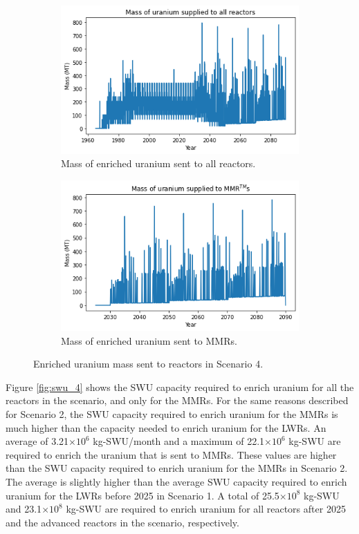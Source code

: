 \begin{figure}
    \centering
    \begin{subfigure}{0.5\textwidth}
        \centering
        \includegraphics[scale=0.5]{../figures/fuelsupply_scenarios_4.png}
        \caption{Mass of enriched uranium sent to all reactors.}
        \label{fig:totalfuel_4}
    \end{subfigure}
    \hspace{0.8cm}
    \begin{subfigure}{0.5\textwidth}
        \centering
        \includegraphics[scale=0.5]{../figures/advancedRX_fuelsupply_scenarios_4.png}
        \caption{Mass of enriched uranium sent to \glspl{MMR}.}
        \label{fig:haleu_4}
    \end{subfigure}
    \caption{Enriched uranium mass sent to reactors in Scenario 4.}
    \label{fig:fuel_4}
\end{figure}

Figure \ref{fig:swu_4} shows the \gls{SWU} capacity required to 
enrich uranium for all the reactors in the scenario, and 
only for the \glspl{MMR}. For the same reasons described for 
Scenario 2, the \gls{SWU} capacity required to enrich uranium 
for the \glspl{MMR} is much higher than the capacity needed to 
enrich uranium for the \glspl{LWR}. An average of 3.21$\times 10^6$ 
kg-\gls{SWU}/month and a maximum of 22.1$\times 10^6$ kg-\gls{SWU}
are required to enrich the uranium that is sent to \glspl{MMR}. These values 
are higher than the \gls{SWU} 
capacity required to enrich uranium for the \glspl{MMR} in 
Scenario 2. The average is slightly higher than the average \gls{SWU} 
capacity required to enrich uranium for the \glspl{LWR} before 2025 in 
Scenario 1. A total of 25.5$\times 10^8$ kg-SWU and 23.1$\times 10^8$
kg-SWU are required to enrich uranium for all reactors after 2025 and the advanced 
reactors in the scenario, respectively. 

